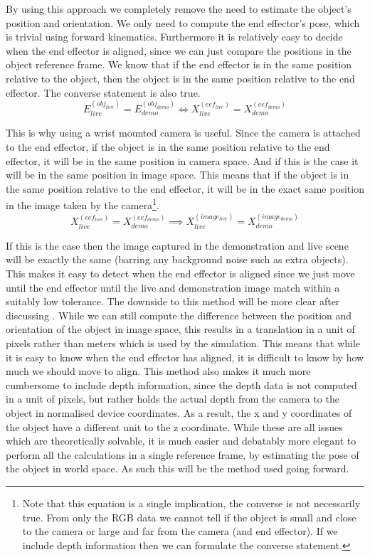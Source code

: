 By using this approach we completely remove the need to estimate the object's position and orientation. We only need to compute the end effector's pose, which is trivial using forward kinematics. Furthermore it is relatively easy to decide when the end effector is aligned, since we can just compare the positions in the object reference frame. We know that if the end effector is in the same position relative to the object, then the object is in the same position relative to the end effector. The converse statement is also true.
$$E_{live}^{(obj_{live})} = E_{demo}^{(obj_{demo})} \iff X_{live}^{(eef_{live})} = X_{demo}^{(eef_{demo})}$$

This is why using a wrist mounted camera is useful. Since the camera is attached to the end effector, if the object is in the same position relative to the end effector, it will be in the same position in camera space. And if this is the case it will be in the same position in image space. This means that if the object is in the same position relative to the end effector, it will be in the exact same position in the image taken by the camera\footnote{Note that this equation is a single implication, the converse is not necessarily true. From only the RGB data we cannot tell if the object is small and close to the camera or large and far from the camera (and end effector). If we include depth information then we can formulate the converse statement.}.
$$X_{live}^{(eef_{live})} = X_{demo}^{(eef_{demo})} \implies X_{live}^{(image_{live})} = X_{demo}^{(image_{demo})}$$

If this is the case then the image captured in the demonstration and live scene will be exactly the same (barring any background noise such as extra objects). This makes it easy to detect when the end effector is aligned since we just move until the end effector until the live and demonstration image match within a suitably low tolerance. The downside to this method will be more clear after discussing . While we can still compute the difference between the position and orientation of the object in image space, this results in a translation in a unit of pixels rather than meters which is used by the simulation. This means that while it is easy to know when the end effector has aligned, it is difficult to know by how much we should move to align. This method also makes it much more cumbersome to include depth information, since the depth data is not computed in a unit of pixels, but rather holds the actual depth from the camera to the object in normalised device coordinates. As a result, the x and y coordinates of the object have a different unit to the z coordinate. While these are all issues which are theoretically solvable, it is much easier and debatably more elegant to perform all the calculations in a single reference frame, by estimating the pose of the object in world space. As such this will be the method used going forward.


